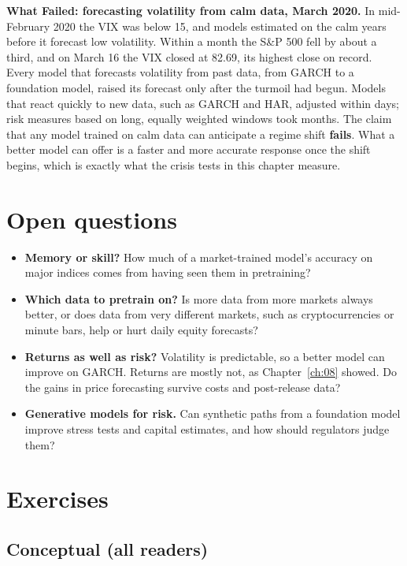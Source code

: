 \begin{callout}
\textbf{What Failed: forecasting volatility from calm data, March 2020.} In mid-February 2020 the VIX was below 15, and models estimated on the calm years before it forecast low volatility. Within a month the S\&P 500 fell by about a third, and on March 16 the VIX closed at 82.69, its highest close on record. Every model that forecasts volatility from past data, from GARCH to a foundation model, raised its forecast only after the turmoil had begun. Models that react quickly to new data, such as GARCH and HAR, adjusted within days; risk measures based on long, equally weighted windows took months. The claim that any model trained on calm data can anticipate a regime shift \textbf{fails}. What a better model can offer is a faster and more accurate response once the shift begins, which is exactly what the crisis tests in this chapter measure.
\end{callout}

\section{Open questions}
\label{sec:22-open}

\begin{itemize}
  \item \textbf{Memory or skill?} How much of a market-trained model's accuracy on major indices comes from having seen them in pretraining?
  \item \textbf{Which data to pretrain on?} Is more data from more markets always better, or does data from very different markets, such as cryptocurrencies or minute bars, help or hurt daily equity forecasts?
  \item \textbf{Returns as well as risk?} Volatility is predictable, so a better model can improve on GARCH. Returns are mostly not, as Chapter~\ref{ch:08} showed. Do the gains in price forecasting survive costs and post-release data?
  \item \textbf{Generative models for risk.} Can synthetic paths from a foundation model improve stress tests and capital estimates, and how should regulators judge them?
\end{itemize}

\section*{Exercises}

\subsection*{Conceptual (all readers)}

